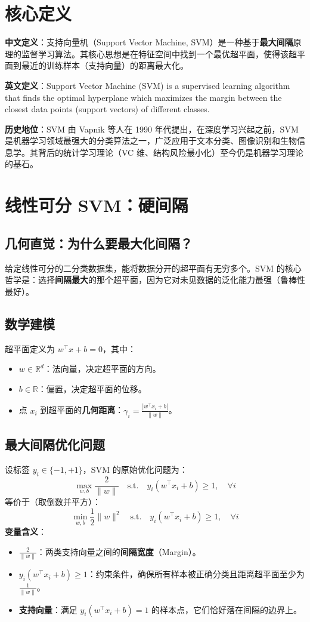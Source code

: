 \documentclass[12pt, a4paper]{book}
\begin{document}
\section{核心定义}
\textbf{中文定义}：支持向量机（Support Vector Machine, SVM）是一种基于\textbf{最大间隔}原理的监督学习算法。其核心思想是在特征空间中找到一个最优超平面，使得该超平面到最近的训练样本（支持向量）的距离最大化。

\textbf{英文定义}：Support Vector Machine (SVM) is a supervised learning algorithm that finds the optimal hyperplane which maximizes the margin between the closest data points (support vectors) of different classes.

\textbf{历史地位}：SVM 由 Vapnik 等人在 1990 年代提出，在深度学习兴起之前，SVM 是机器学习领域最强大的分类算法之一，广泛应用于文本分类、图像识别和生物信息学。其背后的统计学习理论（VC 维、结构风险最小化）至今仍是机器学习理论的基石。

\section{线性可分 SVM：硬间隔}

\subsection{几何直觉：为什么要最大化间隔？}
给定线性可分的二分类数据集，能将数据分开的超平面有无穷多个。SVM 的核心哲学是：选择\textbf{间隔最大}的那个超平面，因为它对未见数据的泛化能力最强（鲁棒性最好）。

\subsection{数学建模}
超平面定义为 $w^\top x + b = 0$，其中：
\begin{itemize}
    \item $w \in \mathbb{R}^d$：法向量，决定超平面的方向。
    \item $b \in \mathbb{R}$：偏置，决定超平面的位移。
    \item 点 $x_i$ 到超平面的\textbf{几何距离}：$\gamma_i = \frac{|w^\top x_i + b|}{\|w\|}$。
\end{itemize}

\subsection{最大间隔优化问题}
设标签 $y_i \in \{-1, +1\}$，SVM 的原始优化问题为：
$$ \max_{w, b} \frac{2}{\|w\|} \quad \text{s.t.} \quad y_i(w^\top x_i + b) \geq 1, \quad \forall i $$
等价于（取倒数并平方）：
$$ \min_{w, b} \frac{1}{2} \|w\|^2 \quad \text{s.t.} \quad y_i(w^\top x_i + b) \geq 1, \quad \forall i $$
\textbf{变量含义}：
\begin{itemize}
    \item $\frac{2}{\|w\|}$：两类支持向量之间的\textbf{间隔宽度}（Margin）。
    \item $y_i(w^\top x_i + b) \geq 1$：约束条件，确保所有样本被正确分类且距离超平面至少为 $\frac{1}{\|w\|}$。
    \item \textbf{支持向量}：满足 $y_i(w^\top x_i + b) = 1$ 的样本点，它们恰好落在间隔的边界上。
\end{itemize}
\end{document}
